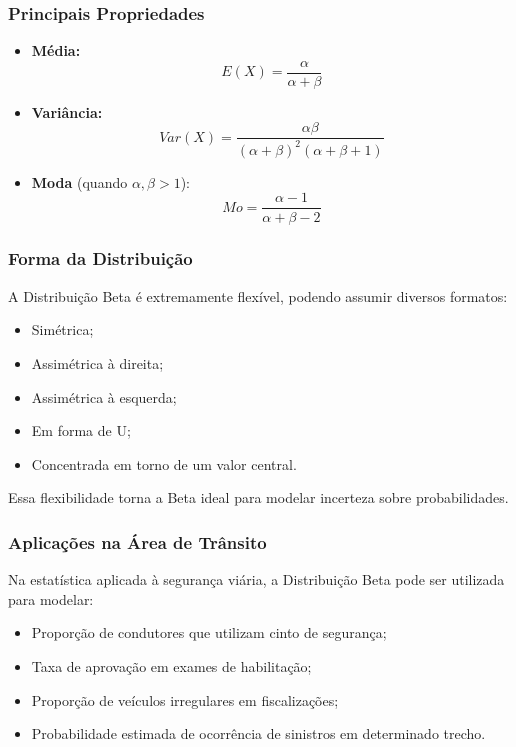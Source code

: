 \subsubsection{Principais Propriedades}

\begin{itemize}
\item \textbf{Média:}
\[
E(X) = \frac{\alpha}{\alpha + \beta}
\]

\item \textbf{Variância:}
\[
Var(X) =
\frac{\alpha\beta}
{(\alpha + \beta)^2(\alpha + \beta + 1)}
\]

\item \textbf{Moda} (quando $\alpha, \beta > 1$):
\[
Mo =
\frac{\alpha - 1}{\alpha + \beta - 2}
\]
\end{itemize}

\subsubsection{Forma da Distribuição}

A Distribuição Beta é extremamente flexível, podendo assumir diversos formatos:

\begin{itemize}
\item Simétrica;
\item Assimétrica à direita;
\item Assimétrica à esquerda;
\item Em forma de U;
\item Concentrada em torno de um valor central.
\end{itemize}

Essa flexibilidade torna a Beta ideal para modelar incerteza sobre probabilidades.

\subsubsection*{Aplicações na Área de Trânsito}

Na estatística aplicada à segurança viária, a Distribuição Beta pode ser utilizada para modelar:

\begin{itemize}
\item Proporção de condutores que utilizam cinto de segurança;
\item Taxa de aprovação em exames de habilitação;
\item Proporção de veículos irregulares em fiscalizações;
\item Probabilidade estimada de ocorrência de sinistros em determinado trecho.
\end{itemize}

